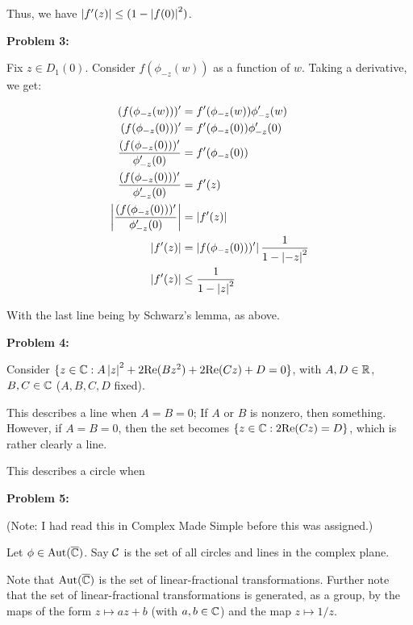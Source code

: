 \documentclass[a4paper,12pt]{article}
\begin{document}
Thus, we have $\left\lvert f'(z) \right\rvert \leq (1-\left\lvert f(0) \right\rvert^2)$.

\shunt

{\bf Problem 3:}

Fix $z \in D_1(0)$. Consider $f(\phi_{-z}(w))$ as a function of $w$. Taking a derivative, we get: 

\begin{align*}
(f(\phi_{-z}(w)))' &= f'(\phi_{-z}(w))\phi_{-z}'(w)\\
(f(\phi_{-z}(0)))' &= f'(\phi_{-z}(0))\phi_{-z}'(0)\\
\frac{(f(\phi_{-z}(0)))'}{\phi_{-z}'(0)} &= f'(\phi_{-z}(0))\\
\frac{(f(\phi_{-z}(0)))'}{\phi_{-z}'(0)} &= f'(z)\\
\left\lvert \frac{(f(\phi_{-z}(0)))'}{\phi_{-z}'(0)} \right\rvert &= \left\lvert f'(z) \right\rvert\\
\left\lvert f'(z) \right\rvert&= \left\lvert f(\phi_{-z}(0)))' \right\rvert \frac{1}{1-\left\lvert -z \right\rvert^2}\\
\left\lvert f'(z) \right\rvert&\leq \frac{1}{1-\left\lvert z \right\rvert^2}\\
\end{align*}

With the last line being by Schwarz's lemma, as above.

\shunt

{\bf Problem 4:}

Consider $\{z \in \mathbb{C}: A \left\lvert z \right\rvert^2 + 2\text{Re}(Bz^2) + 2\text{Re}(Cz) + D = 0\}$, with $A,D \in \mathbb{R}$, $B,C \in \mathbb{C}$ ($A,B,C,D$ fixed).

This describes a line when $A=B=0$; If $A$ or $B$ is nonzero, then something. %
However, if $A=B=0$, then the set becomes $\{z \in \mathbb{C}: 2\text{Re}(Cz) = D\}$, which is rather clearly a line.

This describes a circle when %

\shunt

{\bf Problem 5:}

(Note: I had read this in Complex Made Simple before this was assigned.)

Let $\phi \in \text{Aut}(\overline{\mathbb{C}})$. Say $\mathcal{C}$ is the set of all circles and lines in the complex plane.

Note that $\text{Aut}(\overline{\mathbb{C}})$ is the set of linear-fractional transformations. Further note that the set of linear-fractional transformations is generated, as a group, by the maps of the form $z \mapsto az+b$ (with $a,b \in \mathbb{C}$) and the map $z \mapsto 1/z$.
\end{document}
